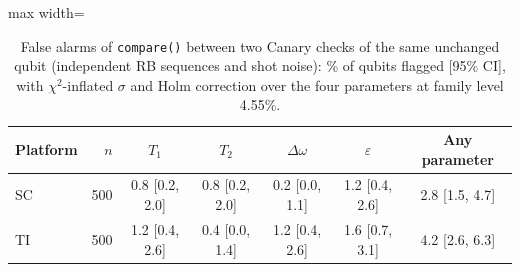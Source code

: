 \begin{table}[!t]
\centering
\footnotesize
\caption{False alarms of \texttt{compare()} between two Canary checks of the same unchanged qubit (independent RB sequences and shot noise): \% of qubits flagged [95\% CI], with $\chi^2$-inflated $\sigma$ and Holm correction over the four parameters at family level 4.55\%.}
\label{tab:s2}
\begin{adjustbox}{max width=\linewidth}
\begin{tabular}{lrccccc}
\hline
Platform & $n$ & $T_1$ & $T_2$ & $\Delta\omega$ & $\varepsilon$ & Any parameter \\
\hline
SC & 500 & 0.8 [0.2, 2.0] & 0.8 [0.2, 2.0] & 0.2 [0.0, 1.1] & 1.2 [0.4, 2.6] & 2.8 [1.5, 4.7] \\
TI & 500 & 1.2 [0.4, 2.6] & 0.4 [0.0, 1.4] & 1.2 [0.4, 2.6] & 1.6 [0.7, 3.1] & 4.2 [2.6, 6.3] \\
\hline
\end{tabular}
\end{adjustbox}
\end{table}

